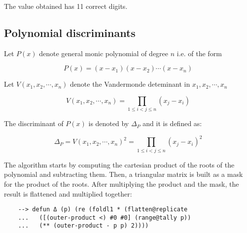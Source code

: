 The value obtained has 11 correct digits.

\subsection{Polynomial discriminants}

Let $P(x)$ denote general monic polynomial of degree $n$ i.e. of the form

$$
P(x) = (x-x_1)(x-x_2) \cdots (x-x_n)
$$

Let $V(x_1,x_2, \cdots, x_n)$ denote the Vandermonde deteminant in $x_1,x_2, \cdots, x_n$

$$
V(x_1,x_2, \cdots , x_n) = \prod\limits_{1 \leq i < j \leq n} (x_j - x_i)
$$

The discriminant of $P(x)$ is denoted by $\Delta_P$ and it is defined as:

$$
\Delta_P = V(x_1,x_2, \cdots , x_n)^2 = \prod\limits_{1 \leq i < j \leq n} (x_j - x_i)^2
$$

The algorithm starts by computing the cartesian product of the roots of the polynomial and subtracting them. Then, a triangular matrix is built as a mask for the product of the roots. After multiplying the product and the mask, the result is flattened and multiplied together:

\begin{Verbatim}
    --> defun Δ (p) (re (foldl1 * (flatten@replicate
    ...   ([(outer-product <) #0 #0] (range@tally p))
    ...   (** (outer-product - p p) 2))))
\end{Verbatim}

